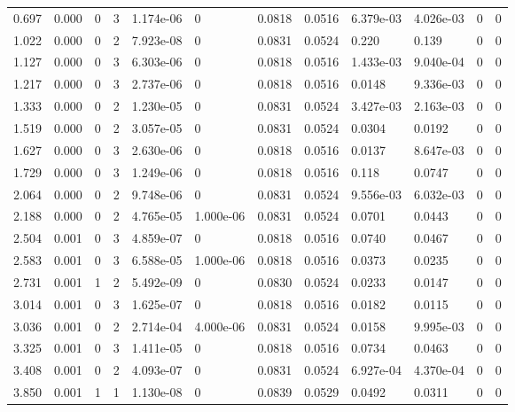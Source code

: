 \documentclass[preview]{standalone}
\begin{document}
{{\begin{tabular}{L{1.2cm}C{1.2cm} C{0.3cm}C{0.5cm} C{1.4cm}C{1.4cm} C{1.4cm}C{1.4cm} C{1.6cm}C{1.6cm} C{1.6cm}C{1.6cm}}
  0.697  &  0.000  & 0     &  3 &  1.174e-06  & 0  &  0.0818&   0.0516& 6.379e-03 & 4.026e-03   &  0 & 0  \\ 
  1.022  &  0.000  & 0     &  2 &  7.923e-08  & 0  &  0.0831&   0.0524& 0.220 & 0.139   &  0 & 0  \\ 
  1.127  &  0.000  & 0     &  3 &  6.303e-06  & 0  &  0.0818&   0.0516& 1.433e-03 & 9.040e-04   &  0 & 0  \\ 
  1.217  &  0.000  & 0     &  3 &  2.737e-06  & 0  &  0.0818&   0.0516& 0.0148 & 9.336e-03   &  0 & 0  \\ 
  1.333  &  0.000  & 0     &  2 &  1.230e-05  & 0  &  0.0831&   0.0524& 3.427e-03 & 2.163e-03   &  0 & 0  \\ 
  1.519  &  0.000  & 0     &  2 &  3.057e-05  & 0  &  0.0831&   0.0524& 0.0304 & 0.0192   &  0 & 0  \\ 
  1.627  &  0.000  & 0     &  3 &  2.630e-06  & 0  &  0.0818&   0.0516& 0.0137 & 8.647e-03   &  0 & 0  \\ 
  1.729  &  0.000  & 0     &  3 &  1.249e-06  & 0  &  0.0818&   0.0516& 0.118 & 0.0747   &  0 & 0  \\ 
  2.064  &  0.000  & 0     &  2 &  9.748e-06  & 0  &  0.0831&   0.0524& 9.556e-03 & 6.032e-03   &  0 & 0  \\ 
  2.188  &  0.000  & 0     &  2 &  4.765e-05  & 1.000e-06  &  0.0831&   0.0524& 0.0701 & 0.0443   &  0 & 0  \\ 
  2.504  &  0.001  & 0     &  3 &  4.859e-07  & 0  &  0.0818&   0.0516& 0.0740 & 0.0467   &  0 & 0  \\ 
  2.583  &  0.001  & 0     &  3 &  6.588e-05  & 1.000e-06  &  0.0818&   0.0516& 0.0373 & 0.0235   &  0 & 0  \\ 
  2.731  &  0.001  & 1     &  2 &  5.492e-09  & 0  &  0.0830&   0.0524& 0.0233 & 0.0147   &  0 & 0  \\ 
  3.014  &  0.001  & 0     &  3 &  1.625e-07  & 0  &  0.0818&   0.0516& 0.0182 & 0.0115   &  0 & 0  \\ 
  3.036  &  0.001  & 0     &  2 &  2.714e-04  & 4.000e-06  &  0.0831&   0.0524& 0.0158 & 9.995e-03   &  0 & 0  \\ 
  3.325  &  0.001  & 0     &  3 &  1.411e-05  & 0  &  0.0818&   0.0516& 0.0734 & 0.0463   &  0 & 0  \\ 
  3.408  &  0.001  & 0     &  2 &  4.093e-07  & 0  &  0.0831&   0.0524& 6.927e-04 & 4.370e-04   &  0 & 0  \\ 
  3.850  &  0.001  & 1     &  1 &  1.130e-08  & 0  &  0.0839&   0.0529& 0.0492 & 0.0311   &  0 & 0  \\ 

\end{tabular}}}
\end{document}
